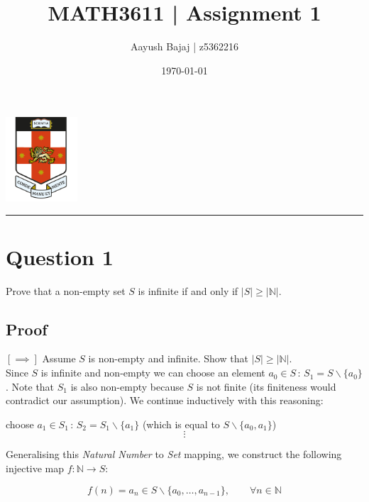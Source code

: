 \documentclass[dvipsnames,12pt]{exam}
\author{Aayush Bajaj | z5362216}
\date{\today}
\title{MATH3611 | Assignment 1}
\newcommand{\N}{{\mathbb{N}}}
\newcommand{\st}{\,:\,}
\begin{document}
\maketitle
\dotfill
\tableofcontents
\vspace{1cm}
\begin{center}
\includegraphics[width=0.2\textwidth]{logo.png}
\end{center}
\vspace{1cm}
\hrule

\newpage

\section{Question 1} \label{question1}
Prove that a non-empty set $S$ is infinite if and only if $|S| \geq |\N|$.

\subsection{Proof}
$[\implies]$ Assume $S$ is non-empty and infinite. Show that $|S| \geq |\N|$.\\

Since $S$ is infinite and non-empty we can choose an element $a_0 \in S \st S_1 = S \backslash \{a_0\}$. Note that $S_1$ is also non-empty because $S$ is not finite (its finiteness would contradict our assumption). We continue inductively with this reasoning:\\

\begin{centering}choose $a_1 \in S_1 \st S_2 = S_1 \backslash \{a_1\}$ (which is equal to $S\backslash\{a_0, a_1\}$)\\
    $$\vdots$$
\end{centering}

Generalising this \emph{Natural Number} to \emph{Set} mapping, we construct the following injective map $f: \N \to S$:

\begin{equation}
    f(n) = a_n \in S\backslash\{a_0,\ldots, a_{n-1}\}, \qquad \forall n \in \N
\end{equation}
\end{document}
